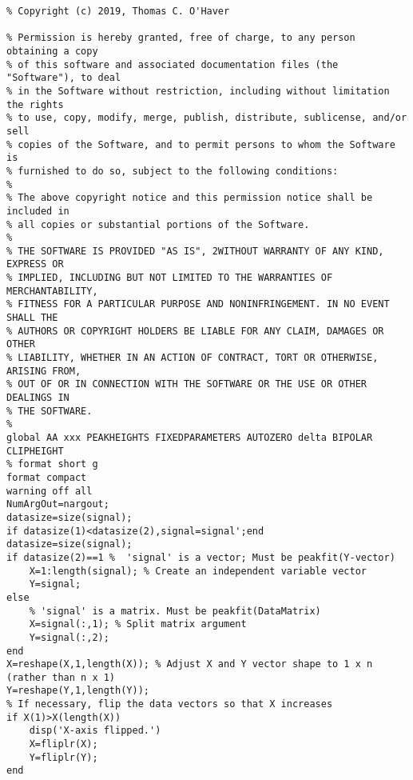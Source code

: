 \begin{lstlisting}
% Copyright (c) 2019, Thomas C. O'Haver
 
% Permission is hereby granted, free of charge, to any person obtaining a copy
% of this software and associated documentation files (the "Software"), to deal
% in the Software without restriction, including without limitation the rights
% to use, copy, modify, merge, publish, distribute, sublicense, and/or sell
% copies of the Software, and to permit persons to whom the Software is
% furnished to do so, subject to the following conditions:
% 
% The above copyright notice and this permission notice shall be included in
% all copies or substantial portions of the Software.
% 
% THE SOFTWARE IS PROVIDED "AS IS", 2WITHOUT WARRANTY OF ANY KIND, EXPRESS OR
% IMPLIED, INCLUDING BUT NOT LIMITED TO THE WARRANTIES OF MERCHANTABILITY,
% FITNESS FOR A PARTICULAR PURPOSE AND NONINFRINGEMENT. IN NO EVENT SHALL THE
% AUTHORS OR COPYRIGHT HOLDERS BE LIABLE FOR ANY CLAIM, DAMAGES OR OTHER
% LIABILITY, WHETHER IN AN ACTION OF CONTRACT, TORT OR OTHERWISE, ARISING FROM,
% OUT OF OR IN CONNECTION WITH THE SOFTWARE OR THE USE OR OTHER DEALINGS IN
% THE SOFTWARE.
% 
global AA xxx PEAKHEIGHTS FIXEDPARAMETERS AUTOZERO delta BIPOLAR CLIPHEIGHT
% format short g
format compact
warning off all
NumArgOut=nargout;
datasize=size(signal);
if datasize(1)<datasize(2),signal=signal';end
datasize=size(signal);
if datasize(2)==1 %  'signal' is a vector; Must be peakfit(Y-vector)
    X=1:length(signal); % Create an independent variable vector
    Y=signal;
else
    % 'signal' is a matrix. Must be peakfit(DataMatrix)
    X=signal(:,1); % Split matrix argument 
    Y=signal(:,2);
end
X=reshape(X,1,length(X)); % Adjust X and Y vector shape to 1 x n (rather than n x 1)
Y=reshape(Y,1,length(Y));
% If necessary, flip the data vectors so that X increases
if X(1)>X(length(X))
    disp('X-axis flipped.')
    X=fliplr(X);
    Y=fliplr(Y);
end


\end{lstlisting}
